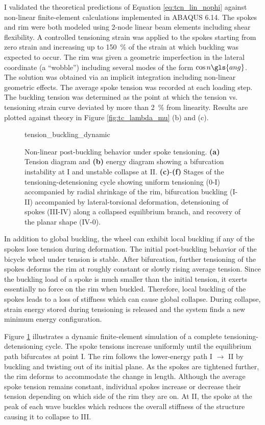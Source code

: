 \documentclass[\rootdir/thesis.tex]{subfiles}
\begin{document}
I validated the theoretical predictions of Equation \eqref{eq:tcn_lin_nophi} against non-linear finite-element calculations implemented in ABAQUS 6.14. The spokes and rim were both modeled using 2-node linear beam elements including shear flexibility. A controlled tensioning strain was applied to the spokes starting from zero strain and increasing up to \SI{150}{\percent} of the strain at which buckling was expected to occur. The rim was given a geometric imperfection in the lateral coordinate (a ``wobble'') including several modes of the form $\cos{n\gls{ang}}$. The solution was obtained via an implicit integration including non-linear geometric effects. The average spoke tension was recorded at each loading step. The buckling tension was determined as the point at which the tension vs. tensioning strain curve deviated by more than \SI{2}{\percent} from linearity. Results are plotted against theory in Figure \ref{fig:tc_lambda_mu} (b) and (c).

\begin{figure}
\centering
{tension_buckling_dynamic}
\caption{Non-linear post-buckling behavior under spoke tensioning. \textbf{(a)} Tension diagram and \textbf{(b)} energy diagram showing a bifurcation instability at I and unstable collapse at II. \textbf{(c)}-\textbf{(f)} Stages of the tensioning-detensioning cycle showing uniform tensioning (0-I) accompanied by radial shrinkage of the rim, bifurcation buckling (I-II) accompanied by lateral-torsional deformation, detensioning of spokes (III-IV) along a collapsed equilibrium branch, and recovery of the planar shape (IV-0).}
\label{fig:tension_buckling_dynamic}
\end{figure}

In addition to global buckling, the wheel can exhibit local buckling if any of the spokes lose tension during deformation. The initial post-buckling behavior of the bicycle wheel under tension is stable. After bifurcation, further tensioning of the spokes deforms the rim at roughly constant or slowly rising average tension. Since the buckling load of a spoke is much smaller than the initial tension, it exerts essentially no force on the rim when buckled. Therefore, local buckling of the spokes leads to a loss of stiffness which can cause global collapse. During collapse, strain energy stored during tensioning is released and the system finds a new minimum energy configuration.

Figure \ref{fig:tension_buckling_dynamic} illustrates a dynamic finite-element simulation of a complete tensioning-detensioning cycle. The spoke tensions increase uniformly until the equilibrium path bifurcates at point I. The rim follows the lower-energy path I $\rightarrow$ II by buckling and twisting out of its initial plane. As the spokes are tightened further, the rim deforms to accommodate the change in length. Although the average spoke tension remains constant, individual spokes increase or decrease their tension depending on which side of the rim they are on. At II, the spoke at the peak of each wave buckles which reduces the overall stiffness of the structure causing it to collapse to III.
\end{document}
